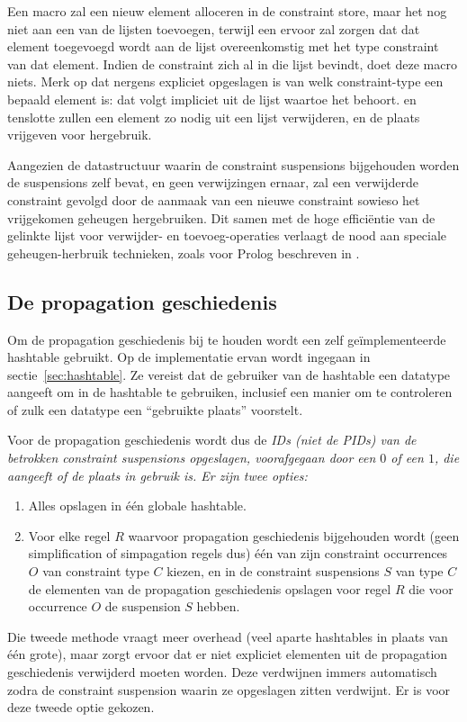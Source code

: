 Een  macro zal een nieuw element alloceren in de constraint store, maar het nog niet aan een van de lijsten toevoegen, terwijl een  ervoor zal zorgen dat dat element toegevoegd wordt aan de lijst overeenkomstig met het type constraint van dat element. Indien de constraint zich al in die lijst bevindt, doet deze macro niets. Merk op dat nergens expliciet opgeslagen is van welk constraint-type een bepaald element is: dat volgt impliciet uit de lijst waartoe het behoort.  en  tenslotte zullen een element zo nodig uit een lijst verwijderen, en de plaats vrijgeven voor hergebruik.

Aangezien de datastructuur waarin de constraint suspensions bijgehouden worden de suspensions zelf bevat, en geen verwijzingen ernaar, zal een verwijderde constraint gevolgd door de aanmaak van een nieuwe constraint sowieso het vrijgekomen geheugen hergebruiken. Dit samen met de hoge effici\"entie van de gelinkte lijst voor verwijder- en toevoeg-operaties verlaagt de nood aan speciale geheugen-herbruik technieken, zoals voor Prolog beschreven in \cite{jon:memory_reuse}.

\subsection{De propagation geschiedenis} \label{sec:prophist}


Om de propagation geschiedenis bij te houden wordt een zelf ge\"implementeerde hashtable gebruikt. Op de implementatie ervan wordt ingegaan in sectie~\ref{sec:hashtable}. Ze vereist dat de gebruiker van de hashtable een datatype aangeeft om in de hashtable te gebruiken, inclusief een manier om te controleren of zulk een datatype een ``gebruikte plaats'' voorstelt.

Voor de propagation geschiedenis wordt dus de \em{ID}s (niet de \em{PID}s) van de betrokken constraint suspensions opgeslagen, voorafgegaan door een $0$ of een $1$, die aangeeft of de plaats in gebruik is. Er zijn twee opties: \begin{enumerate}
  \item Alles opslagen in \'e\'en globale hashtable.
  \item Voor elke regel $R$ waarvoor propagation geschiedenis bijgehouden wordt (geen simplification of simpagation regels dus) \'e\'en van zijn constraint occurrences $O$ van constraint type $C$ kiezen, en in de constraint suspensions $S$ van type $C$ de elementen van de propagation geschiedenis opslagen voor regel $R$ die voor occurrence $O$ de suspension $S$ hebben.
\end{enumerate}
Die tweede methode vraagt meer overhead (veel aparte hashtables in plaats van \'e\'en grote), maar zorgt ervoor dat er niet expliciet elementen uit de propagation geschiedenis verwijderd moeten worden. Deze verdwijnen immers automatisch zodra de constraint suspension waarin ze opgeslagen zitten verdwijnt. Er is voor deze tweede optie gekozen.

